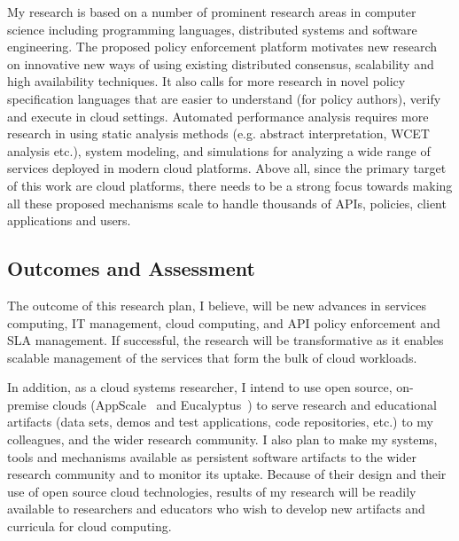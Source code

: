 My research is based on a number of prominent research areas in computer
science including programming languages, 
distributed systems and software engineering. The proposed policy enforcement
platform motivates new research on innovative new ways of using existing
distributed consensus, scalability and high availability techniques. It also calls for
more research in novel policy specification languages that
are easier to understand (for policy authors), verify and execute in cloud settings.
Automated performance analysis requires more research in using
static analysis methods (e.g. abstract interpretation, WCET analysis etc.), system modeling,
and simulations for analyzing a wide range of services deployed in modern cloud platforms.
Above all, since the primary target of this
work are cloud platforms, there needs to be a strong focus towards making all these 
proposed mechanisms scale to handle thousands of APIs, policies, client applications and users.

\subsection{Outcomes and Assessment}

The outcome of this research plan,
I believe, will be new advances in services computing, IT management, cloud
computing, and API policy enforcement and SLA management.
If successful, the research will be transformative as it
enables scalable management of the services that form the
bulk of cloud workloads.

In addition,
as a cloud systems researcher, I intend to use open source, on-premise clouds (AppScale~\cite{krintzappscale13}
and Eucalyptus~\cite{eucalyptus09}) to serve research and educational artifacts (data sets, demos and test applications, 
code repositories, etc.) to my colleagues, 
and the wider research community.  
I also plan to make my systems, tools and mechanisms available as persistent software artifacts to
the wider research community and to monitor its uptake.  Because of their design
and their use of open source cloud technologies, results of my research will be readily available
to researchers and educators who wish to develop new artifacts and curricula
for cloud computing. 